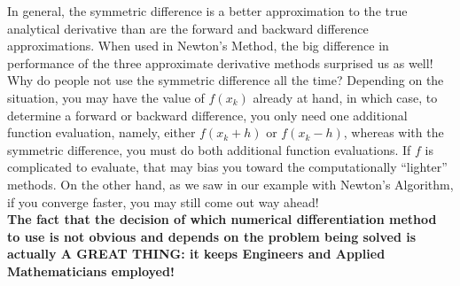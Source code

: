\begin{tcolorbox}[sharp corners, colback=green!30, colframe=green!80!blue,title=\textbf{Symmetric Difference Makes a Difference}]

In general, the symmetric difference is a better approximation to the true analytical derivative than are the forward and backward difference approximations. When used in Newton's Method, the big difference in performance of the three approximate derivative methods surprised us as well!\\

Why do people not use the symmetric difference all the time? Depending on the situation, you may have the value of $f(x_k)$ already at hand, in which case, to determine a forward or backward difference, you only need one additional function evaluation, namely, either $f(x_k + h)$ or $f(x_k - h)$, whereas with the symmetric difference, you must do both additional function evaluations. If $f$ is complicated to evaluate, that may bias you toward the computationally ``lighter'' methods. On the other hand, as we saw in our example with Newton's Algorithm, if you converge faster, you may still come out way ahead! \\

\textbf{The fact that the decision of which numerical differentiation method to use is not obvious and depends on the problem being solved is actually A GREAT THING: it keeps Engineers and Applied Mathematicians employed!} 

\end{tcolorbox}

